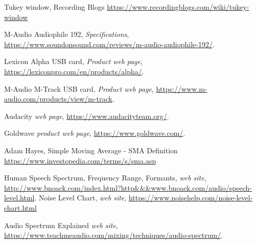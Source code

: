 \documentclass[10pt,a4paper]{report}
\begin{document}
\begin{thebibliography}{9}
	Tukey window, Recording Blogs
	\url{https://www.recordingblogs.com/wiki/tukey-window}
	
	M-Audio Audiophile 192,
	\textit{Specifications},
	\url{https://www.soundonsound.com/reviews/m-audio-audiophile-192/}.
	
	Lexicon Alpha USB card,
	\textit{Product web page},
	\url{https://lexiconpro.com/en/products/alpha/}.
	
	M-Audio M-Track USB card,
	\textit{Product web page},
	\url{	https://www.m-audio.com/products/view/m-track}.
	
	Audacity
	\textit{web page},
	\url{https://www.audacityteam.org/}.
	
	Goldwave
	\textit{product web page},
	\url{https://www.goldwave.com/}.
	
	Adam Hayes, Simple Moving Average - SMA Definition
	\url{https://www.investopedia.com/terms/s/sma.asp}
	
	Human Speech Spectrum, Frequency Range, Formants, 
	\textit{web site},
	\url{http://www.bnoack.com/index.html?http&&&www.bnoack.com/audio/speech-level.html}.
	Noise Level Chart, \textit{web site},
	\url{https://www.noisehelp.com/noise-level-chart.html}
	
	Audio Spectrum Explained
	\textit{web site},
	\url{https://www.teachmeaudio.com/mixing/techniques/audio-spectrum/}.
\end{thebibliography}

\printglossaries
\end{document}
